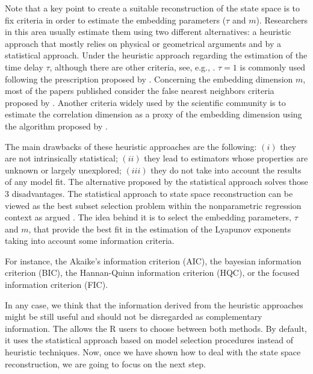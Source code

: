 Note that a key point to create a suitable reconstruction of the state space is to fix criteria in order to estimate the embedding parameters ($\tau$ and $m$). Researchers in this area usually estimate them using two different alternatives: a heuristic approach that mostly relies on physical or geometrical arguments and by a statistical approach. Under the heuristic approach regarding the estimation of the time delay $\tau$, although there are other criteria, see, e.g.\cite{Abarbanel1996}, \cite{Kantz2004}. $\tau = 1$ is commonly used following the prescription proposed by \cite{Takens1981}. Concerning the embedding dimension $m$, most of the papers published consider the false nearest neighbors criteria proposed by \cite{Kennel1992}. Another criteria widely used by the scientific community is to estimate the correlation dimension as a proxy of the embedding dimension using the algorithm proposed by \cite{Grassberger1983}.

The main drawbacks of these heuristic approaches are the following: $\left( i \right)$ they are not intrinsically statistical; $\left( ii \right)$ they lead to estimators whose properties are unknown or largely unexplored; $\left( iii \right)$ they do not take into account the results of any model fit. The alternative proposed by the statistical approach solves those 3 disadvantages. The statistical approach to state space reconstruction can be viewed as the best subset selection problem within the nonparametric regression context as argued \cite{Tong2001}. The idea behind it is to select the embedding parameters, $\tau$ and $m$, that provide the best fit in the estimation of the Lyapunov exponents taking into account some information criteria. 

\newpage
\noindent For instance, the Akaike's information criterion (AIC), the bayesian information criterion (BIC), the Hannan-Quinn information criterion (HQC), or the focused information criterion (FIC). 

In any case, we think that the information derived from the heuristic approaches might be still useful and should not be disregarded as complementary information. The  allows the R users to choose between both methods. By default, it uses the statistical approach based on model selection procedures instead of heuristic techniques. Now, once we have shown how to deal with the state space reconstruction, we are going to focus on the next step.


